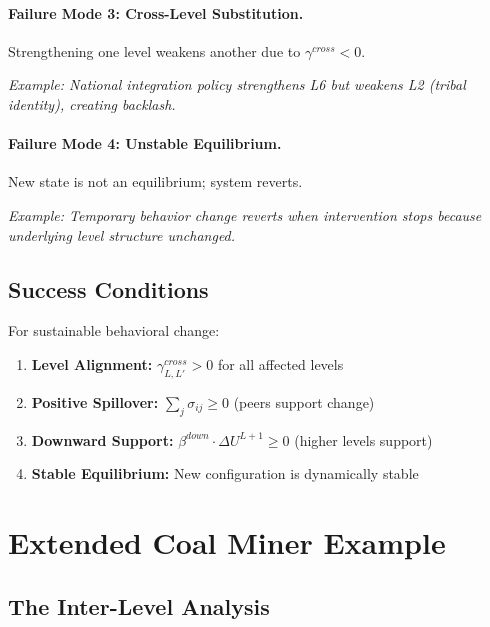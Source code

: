 \paragraph{Failure Mode 3: Cross-Level Substitution.}
Strengthening one level weakens another due to $\gamma^{cross} < 0$.

\textit{Example: National integration policy strengthens L6 but weakens L2 (tribal identity),
creating backlash.}

\paragraph{Failure Mode 4: Unstable Equilibrium.}
New state is not an equilibrium; system reverts.

\textit{Example: Temporary behavior change reverts when intervention stops because
underlying level structure unchanged.}

\subsection{Success Conditions}

For sustainable behavioral change:

\begin{tcolorbox}[colback=green!5!white, colframe=green!50!black, title=Conditions for Successful Multi-Level Intervention]
\begin{enumerate}
\item \textbf{Level Alignment:} $\gamma^{cross}_{L,L'} > 0$ for all affected levels
\item \textbf{Positive Spillover:} $\sum_j \sigma_{ij} \geq 0$ (peers support change)
\item \textbf{Downward Support:} $\beta^{down} \cdot \Delta U^{L+1} \geq 0$ (higher levels support)
\item \textbf{Stable Equilibrium:} New configuration is dynamically stable
\end{enumerate}
\end{tcolorbox}

\section{Extended Coal Miner Example}
\label{sec:aaa-extended-miner}

\subsection{The Inter-Level Analysis}


